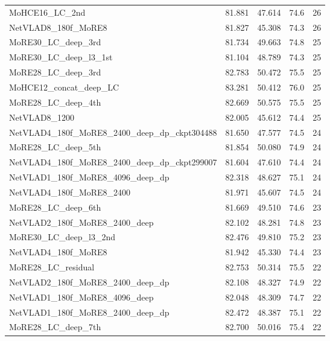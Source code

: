 \documentclass[10pt,twocolumn,letterpaper]{article}
\begin{document}
\begin{appendices}
\begin{table*}[t]
\begin{tabular}{lP{1.5cm}P{1.5cm}P{1.5cm}P{2.5cm}}
MoHCE16\_LC\_2nd                                 &  81.881  &  47.614  &  74.6  &  26 \\
NetVLAD8\_180f\_MoRE8                           &  81.827  &  45.308  &  74.3  &  26 \\
MoRE30\_LC\_deep\_3rd                            &  81.734  &  49.663  &  74.8  &  25 \\
MoRE30\_LC\_deep\_l3\_1st                        &  81.104  &  48.789  &  74.3  &  25 \\
MoRE28\_LC\_deep\_3rd                            &  82.783  &  50.472  &  75.5  &  25 \\
MoHCE12\_concat\_deep\_LC                        &  83.281  &  50.412  &  76.0  &  25 \\
MoRE28\_LC\_deep\_4th                            &  82.669  &  50.575  &  75.5  &  25 \\
NetVLAD8\_1200                                  &  82.005  &  45.612  &  74.4  &  25 \\
NetVLAD4\_180f\_MoRE8\_2400\_deep\_dp\_ckpt304488  &  81.650  &  47.577  &  74.5  & 24  \\
MoRE28\_LC\_deep\_5th                            &  81.854  &  50.080  &  74.9  &  24 \\
NetVLAD4\_180f\_MoRE8\_2400\_deep\_dp\_ckpt299007  &  81.604  &  47.610  &  74.4  & 24  \\
NetVLAD1\_180f\_MoRE8\_4096\_deep\_dp           &  82.318  &  48.627  &  75.1  &  24 \\
NetVLAD4\_180f\_MoRE8\_2400                     &  81.971  &  45.607  &  74.5  &  24 \\
MoRE28\_LC\_deep\_6th                            &  81.669  &  49.510  &  74.6  &  23 \\
NetVLAD2\_180f\_MoRE8\_2400\_deep               &  82.102  &  48.281  &  74.8  &  23 \\
MoRE30\_LC\_deep\_l3\_2nd                        &  82.476  &  49.810  &  75.2  &  23 \\
NetVLAD4\_180f\_MoRE8                           &  81.942  &  45.330  &  74.4  &  23 \\
MoRE28\_LC\_residual                             &  82.753  &  50.314  &  75.5  &  22 \\
NetVLAD2\_180f\_MoRE8\_2400\_deep\_dp           &  82.108  &  48.327  &  74.9  &  22 \\
NetVLAD1\_180f\_MoRE8\_4096\_deep               &  82.048  &  48.309  &  74.7  &  22 \\
NetVLAD1\_180f\_MoRE8\_2400\_deep\_dp           &  82.472  &  48.387  &  75.1  &  22 \\
MoRE28\_LC\_deep\_7th                            &  82.700  &  50.016  &  75.4  &  22 \\
 \hline
\end{tabular}
\end{table*}





\end{appendices}
\end{document}

